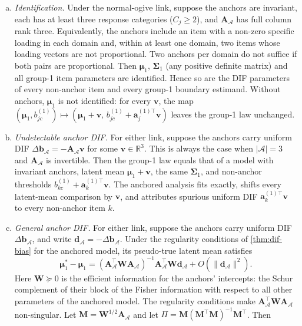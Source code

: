 \begin{proposition}[Anchors]\label{prop:anchor}
\leavevmode
\begin{enumerate}[(a)]
  \item \emph{Identification.} Under the normal-ogive link, suppose the anchors are invariant, each has at least three response categories ($C_j\ge2$), and $\bm A_{\mathcal A}$ has full column rank three. Equivalently, the anchors include an item with a non-zero specific loading in each domain and, within at least one domain, two items whose loading vectors are not proportional. Two anchors per domain do not suffice if both pairs are proportional. Then $\bm\mu_1$, $\bm\Sigma_1$ (any positive definite matrix) and all group-1 item parameters are identified. Hence so are the DIF parameters of every non-anchor item and every group-1 boundary estimand. Without anchors, $\bm\mu_1$ is not identified: for every $\bm v$, the map $(\bm\mu_1,b^{(1)}_{jc})\mapsto(\bm\mu_1+\bm v,\,b^{(1)}_{jc}+\bm a_j^{(1)\top}\bm v)$ leaves the group-1 law unchanged.
  \item \emph{Undetectable anchor DIF.} For either link, suppose the anchors carry uniform DIF $\Delta\bm b_{\mathcal A}=-\bm A_{\mathcal A}\bm v$ for some $\bm v\in\mathbb R^3$. This is always the case when $|\mathcal A|=3$ and $\bm A_{\mathcal A}$ is invertible. Then the group-1 law equals that of a model with invariant anchors, latent mean $\bm\mu_1+\bm v$, the same $\bm\Sigma_1$, and non-anchor thresholds $b^{(1)}_{kc}+\bm a_k^{(1)\top}\bm v$. The anchored analysis fits exactly, shifts every latent-mean comparison by $\bm v$, and attributes spurious uniform DIF $\bm a_k^{(1)\top}\bm v$ to every non-anchor item $k$.
  \item \emph{General anchor DIF.} For either link, suppose the anchors carry uniform DIF $\Delta\bm b_{\mathcal A}$, and write $\bm d_{\mathcal A}=-\Delta\bm b_{\mathcal A}$. Under the regularity conditions of \cref{thm:dif-bias} for the anchored model, its pseudo-true latent mean satisfies
  \begin{equation}\label{eq:id-anchor-bias}
    \bm\mu_1^*-\bm\mu_1=(\bm A_{\mathcal A}^\top\bm W\bm A_{\mathcal A})^{-1}\bm A_{\mathcal A}^\top\bm W\bm d_{\mathcal A}+O(\|\bm d_{\mathcal A}\|^2).
  \end{equation}
  Here $\bm W\succeq0$ is the efficient information for the anchors' intercepts: the Schur complement of their block of the Fisher information with respect to all other parameters of the anchored model. The regularity conditions make $\bm A_{\mathcal A}^\top\bm W\bm A_{\mathcal A}$ non-singular. Let $\bm M=\bm W^{1/2}\bm A_{\mathcal A}$ and let $\Pi=\bm M(\bm M^\top\bm M)^{-1}\bm M^\top$. Then

\end{enumerate}
\end{proposition}

